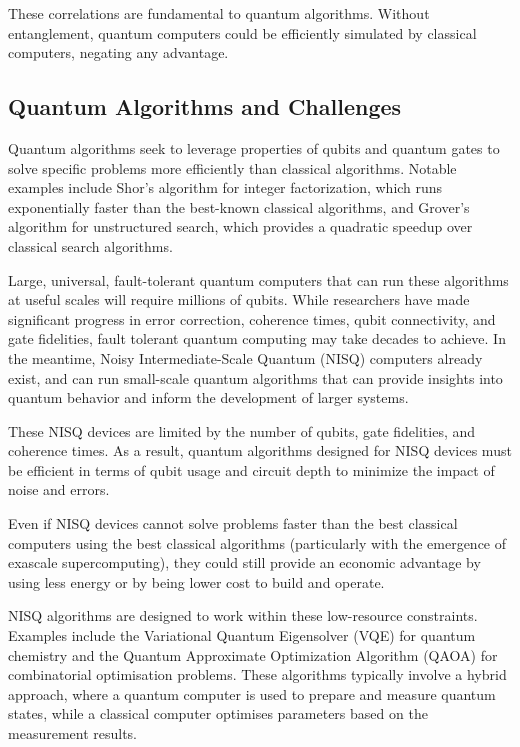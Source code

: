 These correlations are fundamental to quantum algorithms. Without entanglement, quantum computers could be efficiently simulated by classical computers, negating any advantage.

\subsection{Quantum Algorithms and Challenges}

Quantum algorithms seek to leverage properties of qubits and quantum gates to solve specific problems more efficiently than classical algorithms. Notable examples include Shor's algorithm for integer factorization, which runs exponentially faster than the best-known classical algorithms, and Grover's algorithm for unstructured search, which provides a quadratic speedup over classical search algorithms.

Large, universal, fault-tolerant quantum computers that can run these algorithms at useful scales will require millions of qubits. While researchers have made significant progress in error correction, coherence times, qubit connectivity, and gate fidelities, fault tolerant quantum computing may take decades to achieve. In the meantime, Noisy Intermediate-Scale Quantum (NISQ) computers already exist, and can run small-scale quantum algorithms that can provide insights into quantum behavior and inform the development of larger systems.

These NISQ devices are limited by the number of qubits, gate fidelities, and coherence times. As a result, quantum algorithms designed for NISQ devices must be efficient in terms of qubit usage and circuit depth to minimize the impact of noise and errors. 

Even if NISQ devices cannot solve problems faster than the best classical computers using the best classical algorithms (particularly with the emergence of exascale supercomputing), they could still provide an economic advantage by using less energy or by being lower cost to build and operate.

NISQ algorithms are designed to work within these low-resource constraints. Examples include the Variational Quantum Eigensolver (VQE) for quantum chemistry and the Quantum Approximate Optimization Algorithm (QAOA) for combinatorial optimisation problems. These algorithms typically involve a hybrid approach, where a quantum computer is used to prepare and measure quantum states, while a classical computer optimises parameters based on the measurement results.

